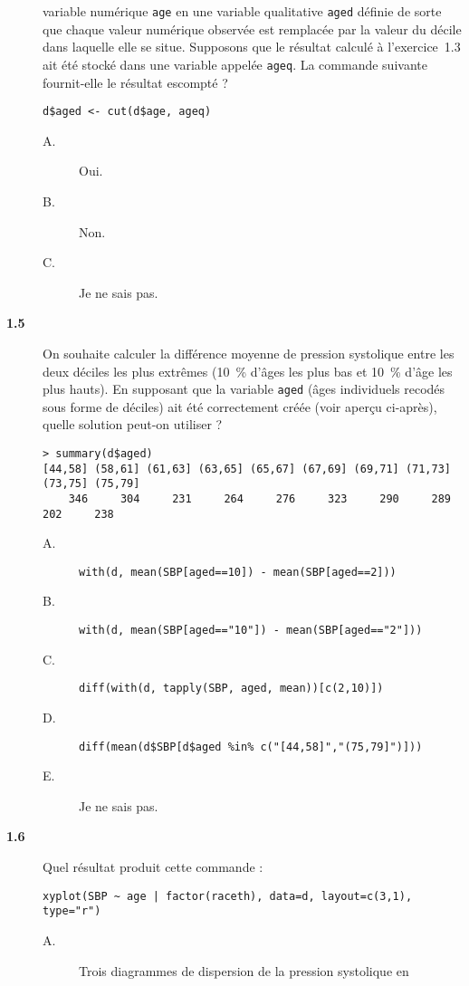 \documentclass[11pt]{report}
\theoremstyle{definition}
\begin{document}
\begin{description}
  variable numérique \texttt{age} en une variable qualitative \texttt{aged}
  définie de sorte que chaque valeur numérique observée est remplacée par la
  valeur du décile dans laquelle elle se situe. Supposons que le résultat
  calculé à l'exercice~1.3 ait été stocké dans une variable appelée
  \texttt{ageq}. La commande suivante fournit-elle le résultat escompté ?
\begin{verbatim}
d$aged <- cut(d$age, ageq)
\end{verbatim}
  \begin{description}
  \item[A.] Oui.
  \item[B.] Non.
  \item[C.] Je ne sais pas.
  \end{description}
\item[\bf 1.5]  On souhaite calculer la différence
  moyenne de pression systolique entre les deux déciles les plus extrêmes
  (10~\% d'âges les plus bas et 10~\% d'âge les plus hauts). En supposant
  que la variable \texttt{aged} (âges individuels recodés sous forme de
  déciles) ait été correctement créée (voir aperçu ci-après), quelle
  solution peut-on utiliser ?
\begin{verbatim}
> summary(d$aged)
[44,58] (58,61] (61,63] (63,65] (65,67] (67,69] (69,71] (71,73] (73,75] (75,79] 
    346     304     231     264     276     323     290     289     202     238
\end{verbatim}
  \begin{description}
  \item[A.] \verb|with(d, mean(SBP[aged==10]) - mean(SBP[aged==2]))|
  \item[B.] \verb|with(d, mean(SBP[aged=="10"]) - mean(SBP[aged=="2"]))|
  \item[C.] \verb|diff(with(d, tapply(SBP, aged, mean))[c(2,10)])|
  \item[D.] \verb|diff(mean(d$SBP[d$aged %in% c("[44,58]","(75,79]")]))|
  \item[E.] Je ne sais pas.
  \end{description}  
\item[\bf 1.6]  Quel résultat produit cette commande : 
\begin{verbatim}
xyplot(SBP ~ age | factor(raceth), data=d, layout=c(3,1), type="r")
\end{verbatim}
  \begin{description}
  \item[A.] Trois diagrammes de dispersion de la pression systolique en

\end{description}
\end{description}
\end{document}

